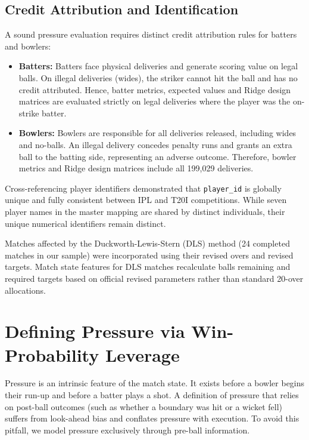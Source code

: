 \documentclass[11pt,a4paper]{article}
\begin{document}
\subsection{Credit Attribution and Identification}
A sound pressure evaluation requires distinct credit attribution rules for batters and bowlers:
\begin{itemize}
    \item \textbf{Batters:} Batters face physical deliveries and generate scoring value on legal balls. On illegal deliveries (wides), the striker cannot hit the ball and has no credit attributed. Hence, batter metrics, expected values and Ridge design matrices are evaluated strictly on legal deliveries where the player was the on-strike batter.
    \item \textbf{Bowlers:} Bowlers are responsible for all deliveries released, including wides and no-balls. An illegal delivery concedes penalty runs and grants an extra ball to the batting side, representing an adverse outcome. Therefore, bowler metrics and Ridge design matrices include all 199,029 deliveries.
\end{itemize}
Cross-referencing player identifiers demonstrated that \texttt{player\_id} is globally unique and fully consistent between IPL and T20I competitions. While seven player names in the master mapping are shared by distinct individuals, their unique numerical identifiers remain distinct.

Matches affected by the Duckworth-Lewis-Stern (DLS) method (24 completed matches in our sample) were incorporated using their revised overs and revised targets. Match state features for DLS matches recalculate balls remaining and required targets based on official revised parameters rather than standard 20-over allocations.

\section{Defining Pressure via Win-Probability Leverage}
\label{sec:pressure}

Pressure is an intrinsic feature of the match state. It exists before a bowler begins their run-up and before a batter plays a shot. A definition of pressure that relies on post-ball outcomes (such as whether a boundary was hit or a wicket fell) suffers from look-ahead bias and conflates pressure with execution. To avoid this pitfall, we model pressure exclusively through pre-ball information.
\end{document}
